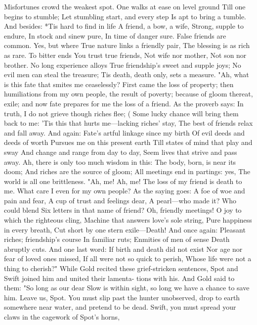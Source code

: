 \documentclass{book}
\begin{document}
Misfortunes crowd the weakest spot.
One walks at ease on level ground
Till one begins to stumble;
Let stumbling start, and every step
Is apt to bring a tumble.
And besides:
*Tis hard to find in life
A friend, a bow, a wife,
Strong, supple to endure,
In stock and sinew pure,
In time of danger sure.
False friends are common. Yes, but where
True nature links a friendly pair,
The blessing is as rich as rare.
To bitter ends
You trust true friends,
Not wife nor mother,
Not son nor brother.
No long experience alloys
True friendship's sweet and supple joys;
No evil men can steal the treasure;
Tis death, death only, sets a measure.
"Ah, what is this fate that smites me ceaselessly?
First came the loss of property; then humiliations
from my own people, the result of poverty; because
of gloom thereat, exile; and now fate prepares for me
the loss of a friend. As the proverb says:
In truth, I do not grieve though riches flee;
(           Some lucky chance will bring them back to me:
'Tis this that hurts me---lacking riches' stay,
The best of friends relax and fall away.
And again:
Fate's artful linkage since my birth
Of evil deeds and deeds of worth
Pursues me on this present earth
Till states of mind that play and sway
And change and range from day to day,
Seem lives that strive and pass away.
Ah, there is only too much wisdom in this:
The body, born, is near its doom;
And riches are the source of gloom;
All meetings end in partings: yes,
The world is all one brittleness.
"Ah, me! Ah, me! The loss of my friend is death
to me. What care I even for my own people? As the
saying goes:
A foe of woe and pain and fear,
A cup of trust and feelings dear,
A pearl---who made it? Who could blend
Six letters in that name of friend?
Oh, friendly meetings!
O joy to which the righteous cling,
Machine that answers love's sole string,
Pure happiness in every breath,
Cut short by one stern exile---Death!
And once again:
Pleasant riches; friendship's course
In familiar ruts;
Enmities of men of sense
Death abruptly cuts.
And one last word:
If birth and death did not exist
Nor age nor fear of loved ones missed,
If all were not so quick to perish,
Whose life were not a thing to cherish?"
While Gold recited these grief-stricken sentences,
Spot and Swift joined him and united their lamenta-
tions with his. And Gold said to them: "So long as
our dear Slow is within sight, so long we have a chance
to save him. Leave us, Spot. You must slip past the
hunter unobserved, drop to earth somewhere near
water, and pretend to be dead. Swift, you must
spread your claws in the cagework of Spot's horns,
\end{document}
